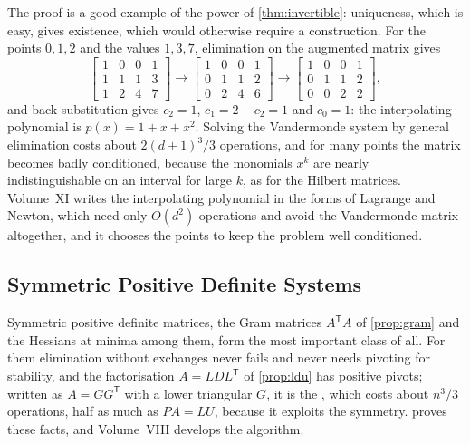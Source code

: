 The proof is a good example of the power of \cref{thm:invertible}: uniqueness, which is easy, gives existence, which would otherwise require a construction. For the points $0,1,2$ and the values $1,3,7$, elimination on the augmented matrix gives
\[
\left[\begin{array}{rrr|r}1&0&0&1\\1&1&1&3\\1&2&4&7\end{array}\right]
\longrightarrow
\left[\begin{array}{rrr|r}1&0&0&1\\0&1&1&2\\0&2&4&6\end{array}\right]
\longrightarrow
\left[\begin{array}{rrr|r}1&0&0&1\\0&1&1&2\\0&0&2&2\end{array}\right],
\]
and back substitution gives $c_2=1$, $c_1=2-c_2=1$ and $c_0=1$: the interpolating polynomial is $p(x)=1+x+x^2$. Solving the Vandermonde system by general elimination costs about $2(d+1)^3/3$ operations, and for many points the matrix becomes badly conditioned, because the monomials $x^k$ are nearly indistinguishable on an interval for large $k$, as for the Hilbert matrices. Volume~XI writes the interpolating polynomial in the forms of Lagrange and Newton, which need only $O(d^2)$ operations and avoid the Vandermonde matrix altogether, and it chooses the points to keep the problem well conditioned.

\subsection{Symmetric Positive Definite Systems}

Symmetric positive definite matrices, the Gram matrices $A^{\mathsf T}A$ of \cref{prop:gram} and the Hessians at minima among them, form the most important class of all. For them elimination without exchanges never fails and never needs pivoting for stability, and the factorisation $A=LDL^{\mathsf T}$ of \cref{prop:ldu} has positive pivots; written as $A=GG^{\mathsf T}$ with a lower triangular $G$, it is the , which costs about $n^3/3$ operations, half as much as $PA=LU$, because it exploits the symmetry.  proves these facts, and Volume~VIII develops the algorithm.

